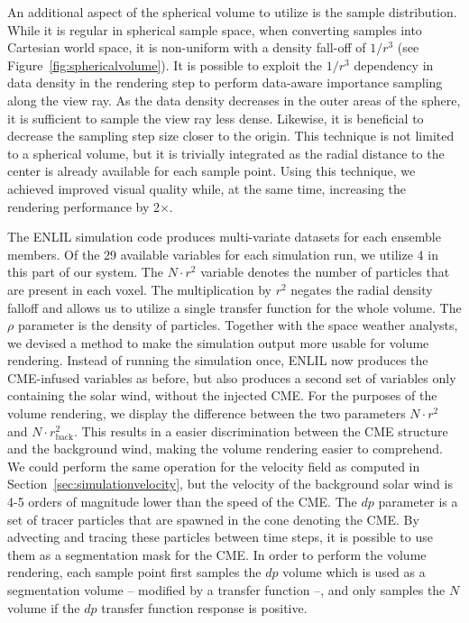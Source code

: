 \documentclass[journal]{vgtc}                %
\begin{document}
 An additional aspect of the spherical volume to utilize is the sample distribution. While it is regular in spherical sample space, when converting samples into Cartesian world space, it is non-uniform with a density fall-off of $1/r^3$ (see Figure~\ref{fig:sphericalvolume}). It is possible to exploit the $1/r^3$ dependency in data density in the rendering step to perform data-aware importance sampling along the view ray. As the data density decreases in the outer areas of the sphere, it is sufficient to sample the view ray less dense. Likewise, it is beneficial to decrease the sampling step size closer to the origin. This technique is not limited to a spherical volume, but it is trivially integrated as the radial distance to the center is already available for each sample point. Using this technique, we achieved improved visual quality while, at the same time, increasing the rendering performance by 2$\times$.

 The ENLIL simulation code produces multi-variate datasets for each ensemble members. Of the 29 available variables for each simulation run, we utilize 4 in this part of our system. The $N \cdot r^2$ variable denotes the number of particles that are present in each voxel. The multiplication by $r^2$ negates the radial density falloff and allows us to utilize a single transfer function for the whole volume. The $\rho$ parameter is the density of particles. Together with the space weather analysts, we devised a method to make the simulation output more usable for volume rendering. Instead of running the simulation once, ENLIL now produces the CME-infused variables as before, but also produces a second set of variables only containing the solar wind, without the injected CME. For the purposes of the volume rendering, we display the difference between the two parameters $N \cdot r^2$ and $N \cdot r^2_\textrm{back}$. This results in a easier discrimination between the CME structure and the background wind, making the volume rendering easier to comprehend. We could perform the same operation for the velocity field as computed in Section~\ref{sec:simulationvelocity}, but the velocity of the background solar wind is 4-5 orders of magnitude lower than the speed of the CME. The $dp$ parameter is a set of tracer particles that are spawned in the cone denoting the CME. By advecting and tracing these particles between time steps, it is possible to use them as a segmentation mask for the CME. In order to perform the volume rendering, each sample point first samples the $dp$ volume which is used as a segmentation volume  -- modified by a transfer function --, and only samples the $N$ volume if the $dp$ transfer function response is positive.
\end{document}
